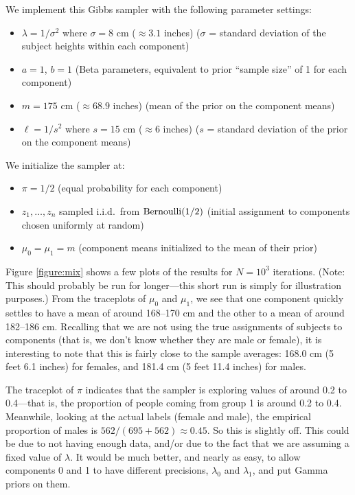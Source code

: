 \documentclass[12pt]{article}
\begin{document}
We implement this Gibbs sampler with the following parameter settings:
\begin{itemize}
\item $\lambda = 1/\sigma^2$ where $\sigma = 8$ cm ($\approx 3.1$ inches) ($\sigma$ = standard deviation of the subject heights within each component)
\item $a = 1$, $b = 1$ (Beta parameters, equivalent to prior ``sample size'' of 1 for each component)
\item $m = 175$ cm ($\approx 68.9$ inches) (mean of the prior on the component means)
\item $\ell = 1/s^2$ where $s = 15$ cm ($\approx 6$ inches) ($s$ = standard deviation of the prior on the component means)
\end{itemize}
We initialize the sampler at:
\begin{itemize}
\item $\pi = 1/2$ (equal probability for each component)
\item $z_1,\ldots,z_n$ sampled i.i.d.\ from $\operatorname*{Bernoulli}(1/2)$ (initial assignment to components chosen uniformly at random)
\item $\mu_0 =\mu_1 = m$ (component means initialized to the mean of their prior)
\end{itemize}
Figure \ref{figure:mix} shows a few plots of the results for $N = 10^3$ iterations. (Note: This should probably be run for longer---this short run is simply for illustration purposes.) From the traceplots of $\mu_0$ and $\mu_1$, we see that one component quickly settles to have a mean of around 168--170 cm and the other to a mean of around 182--186 cm. Recalling that we are not using the true assignments of subjects to components (that is, we don't know whether they are male or female), it is interesting to note that this is fairly close to the sample averages: 168.0 cm (5 feet 6.1 inches) for females, and 181.4 cm (5 feet 11.4 inches) for males.

The traceplot of $\pi$ indicates that the sampler is exploring values of around 0.2 to 0.4---that is, the proportion of people coming from group 1 is around 0.2 to 0.4. Meanwhile, looking at the actual labels (female and male), the empirical proportion of males is $562/(695+562) \approx 0.45$. So this is slightly off. This could be due to not having enough data, and/or due to the fact that we are assuming a fixed value of $\lambda$. It would be much better, and nearly as easy, to allow components 0 and 1 to have different precisions, $\lambda_0$ and $\lambda_1$, and put Gamma priors on them.
 
\end{document}
